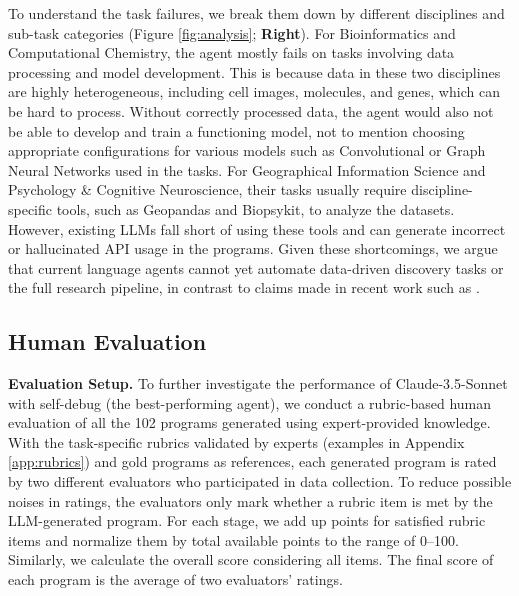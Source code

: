 \documentclass{article} %
\begin{document}
%
To understand the task failures, we break them down by different disciplines and sub-task categories (Figure \ref{fig:analysis}; \textbf{Right}).
For Bioinformatics and Computational Chemistry, the agent mostly fails on tasks involving data processing and model development.
This is because data in these two disciplines are highly heterogeneous, including cell images, molecules, and genes, which can be hard to process.
Without correctly processed data, the agent would also not be able to develop and train a functioning model, not to mention choosing appropriate configurations for various models such as Convolutional or Graph Neural Networks used in the tasks.
For Geographical Information Science and Psychology \& Cognitive Neuroscience, their tasks usually require discipline-specific tools, such as Geopandas and Biopsykit, to analyze the datasets.
However, existing LLMs fall short of using these tools and can generate incorrect or hallucinated API usage in the programs.
Given these shortcomings, we argue that current language agents cannot yet automate data-driven discovery tasks or the full research pipeline, in contrast to claims made in recent work such as \cite{lu2024aiscientistfullyautomated}.
%

\subsection{Human Evaluation}
\label{sec:human_eval}

%
\textbf{Evaluation Setup.}
To further investigate the performance of Claude-3.5-Sonnet with self-debug (the best-performing agent), we conduct a rubric-based human evaluation of all the 102 programs generated using expert-provided knowledge.
With the task-specific rubrics validated by experts (examples in Appendix \ref{app:rubrics}) and gold programs as references, each generated program is rated by two different evaluators who participated in data collection.
To reduce possible noises in ratings, the evaluators only mark whether a rubric item is met by the LLM-generated program. %
For each stage, we add up points for satisfied rubric items and normalize them by total available points to the range of 0--100.
Similarly, we calculate the overall score considering all items.
The final score of each program is the average of two evaluators' ratings.
%
\end{document}
